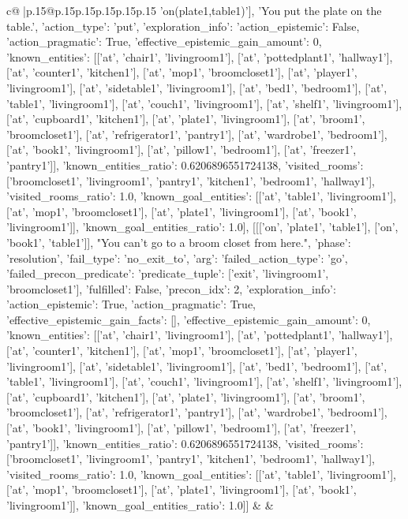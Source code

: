 \documentclass{article}
\begin{document}
{\begin{supertabular}{c@{$\;$}|p{.15\linewidth}@{}p{.15\linewidth}p{.15\linewidth}p{.15\linewidth}p{.15\linewidth}p{.15\linewidth}}
{{{'on(plate1,table1)'], 'You put the plate on the table.', {'action_type': 'put', 'exploration_info': {'action_epistemic': False, 'action_pragmatic': True, 'effective_epistemic_gain_amount': 0, 'known_entities': [['at', 'chair1', 'livingroom1'], ['at', 'pottedplant1', 'hallway1'], ['at', 'counter1', 'kitchen1'], ['at', 'mop1', 'broomcloset1'], ['at', 'player1', 'livingroom1'], ['at', 'sidetable1', 'livingroom1'], ['at', 'bed1', 'bedroom1'], ['at', 'table1', 'livingroom1'], ['at', 'couch1', 'livingroom1'], ['at', 'shelf1', 'livingroom1'], ['at', 'cupboard1', 'kitchen1'], ['at', 'plate1', 'livingroom1'], ['at', 'broom1', 'broomcloset1'], ['at', 'refrigerator1', 'pantry1'], ['at', 'wardrobe1', 'bedroom1'], ['at', 'book1', 'livingroom1'], ['at', 'pillow1', 'bedroom1'], ['at', 'freezer1', 'pantry1']], 'known_entities_ratio': 0.6206896551724138, 'visited_rooms': ['broomcloset1', 'livingroom1', 'pantry1', 'kitchen1', 'bedroom1', 'hallway1'], 'visited_rooms_ratio': 1.0, 'known_goal_entities': [['at', 'table1', 'livingroom1'], ['at', 'mop1', 'broomcloset1'], ['at', 'plate1', 'livingroom1'], ['at', 'book1', 'livingroom1']], 'known_goal_entities_ratio': 1.0}}], [[['on', 'plate1', 'table1'], ['on', 'book1', 'table1']], "You can't go to a broom closet from here.", {'phase': 'resolution', 'fail_type': 'no_exit_to', 'arg': {'failed_action_type': 'go', 'failed_precon_predicate': {'predicate_tuple': ['exit', 'livingroom1', 'broomcloset1'], 'fulfilled': False, 'precon_idx': 2}}, 'exploration_info': {'action_epistemic': True, 'action_pragmatic': True, 'effective_epistemic_gain_facts': [], 'effective_epistemic_gain_amount': 0, 'known_entities': [['at', 'chair1', 'livingroom1'], ['at', 'pottedplant1', 'hallway1'], ['at', 'counter1', 'kitchen1'], ['at', 'mop1', 'broomcloset1'], ['at', 'player1', 'livingroom1'], ['at', 'sidetable1', 'livingroom1'], ['at', 'bed1', 'bedroom1'], ['at', 'table1', 'livingroom1'], ['at', 'couch1', 'livingroom1'], ['at', 'shelf1', 'livingroom1'], ['at', 'cupboard1', 'kitchen1'], ['at', 'plate1', 'livingroom1'], ['at', 'broom1', 'broomcloset1'], ['at', 'refrigerator1', 'pantry1'], ['at', 'wardrobe1', 'bedroom1'], ['at', 'book1', 'livingroom1'], ['at', 'pillow1', 'bedroom1'], ['at', 'freezer1', 'pantry1']], 'known_entities_ratio': 0.6206896551724138, 'visited_rooms': ['broomcloset1', 'livingroom1', 'pantry1', 'kitchen1', 'bedroom1', 'hallway1'], 'visited_rooms_ratio': 1.0, 'known_goal_entities': [['at', 'table1', 'livingroom1'], ['at', 'mop1', 'broomcloset1'], ['at', 'plate1', 'livingroom1'], ['at', 'book1', 'livingroom1']], 'known_goal_entities_ratio': 1.0}}]] 
	  } 
	   } 
	   } 
	 & & \\ 
 


\end{supertabular}}
\end{document}
